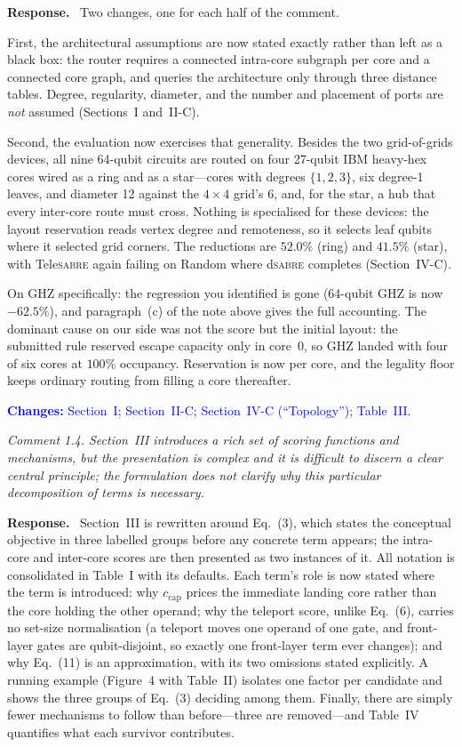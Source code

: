 \documentclass[11pt]{article}
\newcommand{\dSABRE}{d\textsc{sabre}}
\newcommand{\TeleSABRE}{Tele\textsc{sabre}}
\newenvironment{comment}{\medskip\noindent\itshape}{\par}
\newcommand{\response}{\smallskip\noindent\textbf{Response.}\ }
\newcommand{\where}[1]{\textcolor{blue}{\textbf{Changes:} #1}}
\begin{document}
\response
Two changes, one for each half of the comment.

First, the architectural assumptions are now stated exactly rather than left
as a black box: the router requires a connected intra-core subgraph per core
and a connected core graph, and queries the architecture only through three
distance tables. Degree, regularity, diameter, and the number and placement of
ports are \emph{not} assumed (Sections~I and~II-C).

Second, the evaluation now exercises that generality. Besides the two
grid-of-grids devices, all nine 64-qubit circuits are routed on four 27-qubit
IBM heavy-hex cores wired as a ring and as a star---cores with degrees
$\{1,2,3\}$, six degree-1 leaves, and diameter 12 against the $4\times4$
grid's 6, and, for the star, a hub that every inter-core route must cross.
Nothing is specialised for these devices: the layout reservation reads vertex
degree and remoteness, so it selects leaf qubits where it selected grid
corners. The reductions are $52.0\%$ (ring) and $41.5\%$ (star), with
\TeleSABRE{} again failing on Random where \dSABRE{} completes
(Section~IV-C).

On GHZ specifically: the regression you identified is gone (64-qubit GHZ is now
$-62.5\%$), and paragraph~(c) of the note above gives the full accounting.
The dominant cause on our side was not the score but the initial layout: the
submitted rule reserved escape capacity only in core~0, so GHZ landed with
four of six cores at $100\%$ occupancy. Reservation is now per core, and the
legality floor keeps ordinary routing from filling a core thereafter.

\where{Section~I; Section~II-C; Section~IV-C (``Topology''); Table~III.}

\begin{comment}
Comment 1.4. Section~III introduces a rich set of scoring functions and
mechanisms, but the presentation is complex and it is difficult to discern a
clear central principle; the formulation does not clarify why this particular
decomposition of terms is necessary.
\end{comment}

\response
Section~III is rewritten around Eq.~(3), which states the conceptual objective
in three labelled groups before any concrete term appears; the intra-core and
inter-core scores are then presented as two instances of it. All notation is
consolidated in Table~I with its defaults. Each term's role is now stated
where the term is introduced: why $c_{\mathrm{cap}}$ prices the immediate
landing core rather than the core holding the other operand; why the teleport
score, unlike Eq.~(6), carries no set-size normalisation (a teleport moves one
operand of one gate, and front-layer gates are qubit-disjoint, so exactly one
front-layer term ever changes); and why Eq.~(11) is an approximation, with its
two omissions stated explicitly. A running example (Figure~4 with Table~II)
isolates one factor per candidate and shows the three groups of Eq.~(3)
deciding among them. Finally, there are simply fewer mechanisms to follow than
before---three are removed---and Table~IV quantifies what each survivor
contributes.
\end{document}
